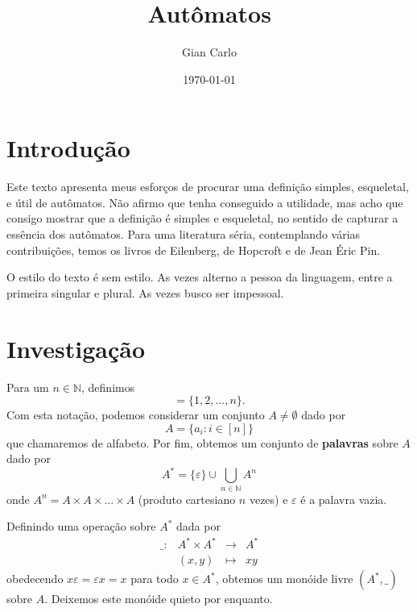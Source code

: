 \documentclass[11pt]{article}
\title{Autômatos}
\author{Gian Carlo}
\date{\today}
\theoremstyle{plain}
\theoremstyle{nonumberplain}
\newcommand{\naturais}{\mathbb{N}}
\newcommand{\set}[1]{\{#1\}}
\newcommand{\ainf}{A^*}
\begin{document}
\maketitle

\section{Introdução}

Este texto apresenta meus esforços de procurar uma definição simples, esqueletal, 
e útil de autômatos. Não afirmo que tenha conseguido a utilidade, mas acho que
consigo mostrar que a definição é simples e esqueletal, no sentido de capturar
a essência dos autômatos. Para uma literatura séria, contemplando várias 
contribuições, temos os livros de Eilenberg, de Hopcroft e de Jean Éric Pin.

O estilo do texto é sem estilo. As vezes alterno a pessoa da linguagem, entre a primeira singular e plural. As vezes busco ser impessoal. 

\section{Investigação}

Para um $n \in \naturais$, definimos \begin{equation}
    [n] = \set{1, 2, ..., n}.
\end{equation}
Com esta notação, podemos considerar um conjunto $A \neq \emptyset$ dado por \begin{equation}
    A = \set{a_i : i \in [n]}
\end{equation}
que chamaremos de alfabeto. Por fim, obtemos um conjunto de \textbf{palavras} sobre $A$
dado por \begin{equation}
    \ainf = \set \varepsilon \cup \bigcup_{n \in \naturais} A^n
\end{equation}
onde $A^n = A \times A \times ... \times A$ (produto cartesiano $n$ vezes) 
e $\varepsilon$ é a palavra vazia.

Definindo uma operação sobre $\ainf$ dada por \begin{equation}
    \begin{array}{cccc}
        \_ : & \ainf \times \ainf & \to & \ainf \\
        & (x, y) & \mapsto & xy
    \end{array}
\end{equation}
obedecendo $x\varepsilon = \varepsilon x = x$ para todo $x \in \ainf$,
obtemos um monóide livre $(\ainf, \_)$ sobre $A$. Deixemos este monóide quieto
por enquanto.
\end{document}
